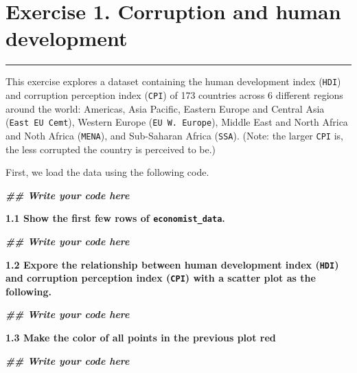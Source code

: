 \documentclass[
]{article}
\author{}
\date{\vspace{-2.5em}}
\newenvironment{Shaded}{\begin{snugshade}}{\end{snugshade}}
\newcommand{\DocumentationTok}[1]{\textcolor[rgb]{0.56,0.35,0.01}{\textbf{\textit{#1}}}}
\begin{document}
\section{\texorpdfstring{\textbf{Exercise 1. Corruption and human
development}}{Exercise 1. Corruption and human development}}\label{exercise-1.-corruption-and-human-development}

\begin{center}\rule{0.5\linewidth}{0.5pt}\end{center}

This exercise explores a dataset containing the human development index
(\texttt{HDI}) and corruption perception index (\texttt{CPI}) of 173
countries across 6 different regions around the world: Americas, Asia
Pacific, Eastern Europe and Central Asia (\texttt{East\ EU\ Cemt}),
Western Europe (\texttt{EU\ W.\ Europe}), Middle East and North Africa
and Noth Africa (\texttt{MENA}), and Sub-Saharan Africa (\texttt{SSA}).
(Note: the larger \texttt{CPI} is, the less corrupted the country is
perceived to be.)

First, we load the data using the following code.

\begin{Shaded}
\begin{Highlighting}[]
\DocumentationTok{\#\# Write your code here}
\end{Highlighting}
\end{Shaded}

\textbf{1.1 Show the first few rows of \texttt{economist\_data}.}

\begin{Shaded}
\begin{Highlighting}[]
\DocumentationTok{\#\# Write your code here}
\end{Highlighting}
\end{Shaded}

\textbf{1.2 Expore the relationship between human development index
(\texttt{HDI}) and corruption perception index (\texttt{CPI}) with a
scatter plot as the following.}

\begin{Shaded}
\begin{Highlighting}[]
\DocumentationTok{\#\# Write your code here}
\end{Highlighting}
\end{Shaded}

\textbf{1.3 Make the color of all points in the previous plot red}

\begin{Shaded}
\begin{Highlighting}[]
\DocumentationTok{\#\# Write your code here}
\end{Highlighting}
\end{Shaded}
\end{document}

